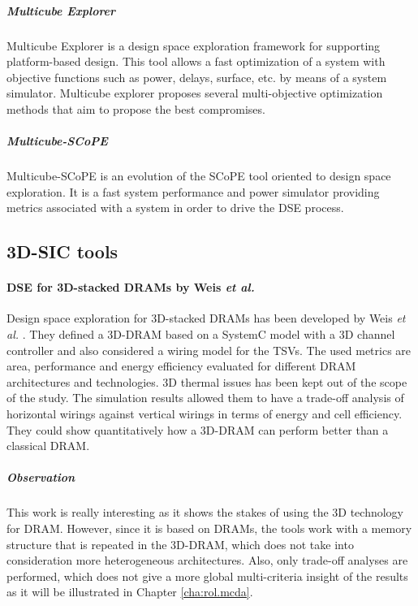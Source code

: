 \subparagraph{Multicube Explorer}

Multicube Explorer \cite{m3explorer09} is a design space exploration framework for supporting platform-based design. This tool allows a fast optimization of a system with objective functions such as power, delays, surface, etc. by means of a system simulator. Multicube explorer proposes several multi-objective optimization methods that aim to propose the best compromises.

\subparagraph{Multicube-SCoPE}

Multicube-SCoPE \cite{m3scope09} is an evolution of the SCoPE tool \cite{scope04} oriented to design space exploration. It is a fast system performance and power simulator providing metrics associated with a system in order to drive the DSE process.

\subsection{3D-SIC tools}

\paragraph{DSE for 3D-stacked DRAMs by Weis \textit{et al.}}
Design space exploration for 3D-stacked DRAMs has been developed by Weis \textit{et al.} \cite{5763068}. They defined a 3D-DRAM based on a SystemC model with a 3D channel controller and also considered a wiring model for the TSVs. The used metrics are area, performance and energy efficiency evaluated for different DRAM architectures and technologies. 3D thermal issues has been kept out of the scope of the study. The simulation results allowed them to have a trade-off analysis of horizontal wirings against vertical wirings in terms of energy and cell efficiency. They could show quantitatively how a 3D-DRAM can perform better than a classical DRAM.

\subparagraph{Observation}
This work is really interesting as it shows the stakes of using the 3D technology for DRAM. However, since it is based on DRAMs, the tools work with a memory structure that is repeated in the 3D-DRAM, which does not take into consideration more heterogeneous architectures. Also, only trade-off analyses are performed, which does not give a more global multi-criteria insight of the results as it will be illustrated in Chapter \ref{cha:rol.mcda}.


